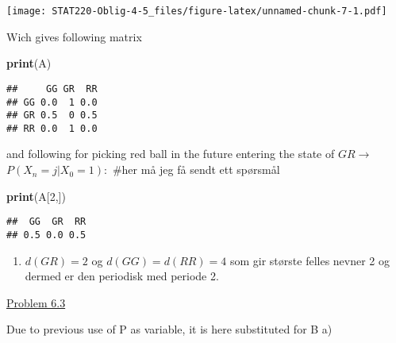 \documentclass[]{article}
\newenvironment{Shaded}{\begin{snugshade}}{\end{snugshade}}
\newcommand{\DecValTok}[1]{\textcolor[rgb]{0.00,0.00,0.81}{#1}}
\newcommand{\KeywordTok}[1]{\textcolor[rgb]{0.13,0.29,0.53}{\textbf{#1}}}
\newcommand{\NormalTok}[1]{#1}
\providecommand{\tightlist}{%
  \setlength{\itemsep}{0pt}\setlength{\parskip}{0pt}}
\begin{document}
\texttt{[image: STAT220-Oblig-4-5\_files/figure-latex/unnamed-chunk-7-1.pdf]}

Wich gives following matrix

\begin{Shaded}
\begin{Highlighting}[]
\KeywordTok{print}\NormalTok{(A)}
\end{Highlighting}
\end{Shaded}

\begin{verbatim}
##     GG GR  RR
## GG 0.0  1 0.0
## GR 0.5  0 0.5
## RR 0.0  1 0.0
\end{verbatim}

and following for picking red ball in the future entering the state of
\(GR\rightarrow\) \(P(X_{n}=j|X_{0}=1):\) \#her må jeg få sendt ett
spørsmål

\begin{Shaded}
\begin{Highlighting}[]
\KeywordTok{print}\NormalTok{(A[}\DecValTok{2}\NormalTok{,])}
\end{Highlighting}
\end{Shaded}

\begin{verbatim}
##  GG  GR  RR 
## 0.5 0.0 0.5
\end{verbatim}

\begin{enumerate}
\def\labelenumi{\alph{enumi})}
\setcounter{enumi}{1}
\tightlist
\item
  \(d(GR)=2\) og \(d(GG)=d(RR)=4\) som gir største felles nevner 2 og
  dermed er den periodisk med periode 2.
\end{enumerate}

\underline{Problem 6.3}

Due to previous use of P as variable, it is here substituted for B a)
\end{document}
